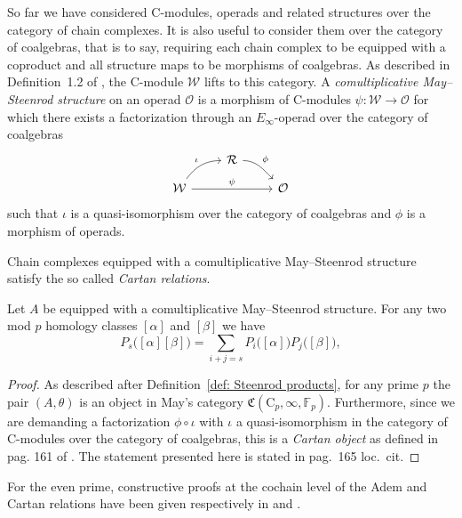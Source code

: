 So far we have considered $\mathrm{C}$-modules, operads and related structures over the category of chain complexes.
It is also useful to consider them over the category of coalgebras, that is to say, requiring each chain complex to be equipped with a coproduct and all structure maps to be morphisms of coalgebras.
As described in Definition~1.2 of \cite{may1970general}, the $\mathrm{C}$-module $\mathcal W$ lifts to this category.
A \textit{comultiplicative May--Steenrod structure} on an operad $\mathcal O$ is a morphism of $\mathrm{C}$-modules $\psi \colon \mathcal W \to \mathcal O$ for which there exists a factorization through an $E_\infty$-operad over the category of coalgebras
\begin{equation*}
\begin{tikzcd}[column sep = normal, row sep = small]
& \mathcal R \arrow[dr, "\phi", out=0] & \\
\mathcal W \arrow[ur, "\iota", out=55, in=180] \arrow[rr, "\psi"] & & \mathcal O
\end{tikzcd}
\end{equation*}
such that $\iota$ is a quasi-isomorphism over the category of coalgebras and $\phi$ is a morphism of operads.

Chain complexes equipped with a comultiplicative May--Steenrod structure satisfy the so called \textit{Cartan relations}.

\begin{lemma}
	Let $A$ be equipped with a comultiplicative May--Steenrod structure.
	For any two mod $p$ homology classes $[\alpha]$ and $[\beta]$ we have
	\begin{equation*}
	P_s\big([\alpha] [\beta]\big) = \sum_{i+j=s} P_i\big( [\alpha] \big) P_j\big( [\beta] \big),
	\end{equation*}
\end{lemma}

\begin{proof}
	As described after Definition~\ref{def: Steenrod products}, for any prime $p$ the pair $(A, \theta)$ is an object in May's category $\mathfrak{C}(\mathrm C_p, \infty, \mathbb{F}_p)$.
	Furthermore, since we are demanding a factorization $\phi \circ \iota$ with $\iota$ a quasi-isomorphism in the category of $\mathrm{C}$-modules over the category of coalgebras, this is a \textit{Cartan object} as defined in pag. 161 of \cite{may1970general}.
	The statement presented here is stated in pag.~165 loc.~cit.
\end{proof}

For the even prime, constructive proofs at the cochain level of the Adem and Cartan relations have been given respectively in \cite{medina2021adem} and \cite{medina2020cartan}.